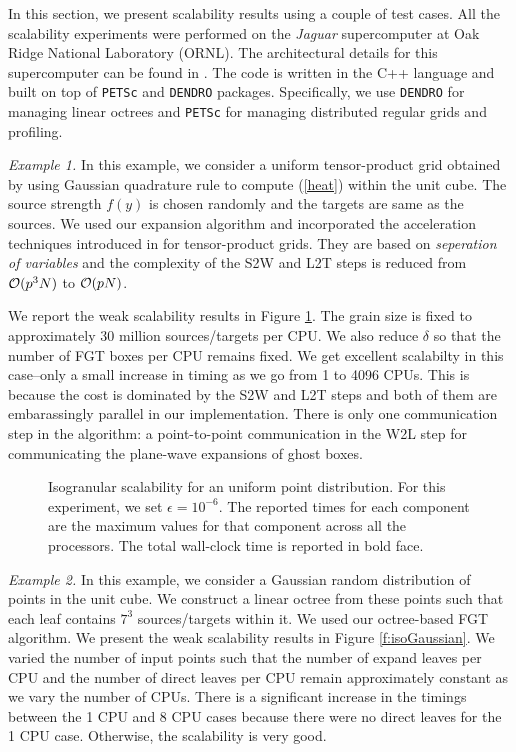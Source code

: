 
In this section, we present scalability results using a couple of test cases.  All the scalability experiments were performed 
on the {\it{Jaguar}} supercomputer at Oak Ridge National Laboratory (ORNL). The architectural details for this supercomputer
 can be found in \cite{jaguar}. The code is written in the C++ language and built on top of \texttt{PETSc} and \texttt{DENDRO} packages. 
 Specifically, we use \texttt{DENDRO} for managing linear octrees and \texttt{PETSc} for managing distributed regular grids and profiling. 

{\em Example 1.} In this example, we consider a uniform tensor-product grid obtained by using Gaussian quadrature rule to
 compute (\ref{heat}) within the unit cube. The source strength $f(y)$ is chosen randomly and the targets are same as the
  sources. We used our expansion algorithm and incorporated the acceleration techniques
  introduced in \cite{fggt} for tensor-product grids. They are based on {\em seperation of variables} and
  the complexity of the S2W and L2T steps is reduced from $\mathcal{O}(p^3 N)$ to $\mathcal{O}(p N)$. 

We report the weak scalability results in Figure \ref{f:isoUniform}. The grain size is fixed to approximately 30 million 
sources/targets per CPU. We also reduce $\delta$ so that the number of FGT boxes per CPU remains fixed. We get excellent
 scalabilty in this case--only a small increase in timing as we go from 1 to 4096 CPUs. This is  because the cost is dominated 
 by the S2W and L2T steps and both of them are embarassingly parallel in our implementation. There is only one communication 
 step in the algorithm: a point-to-point communication in the W2L step for communicating the plane-wave expansions of ghost boxes.

\begin{figure}
	\begin{center}
	
	\end{center}
\caption{\label{f:isoUniform} Isogranular scalability for an uniform point distribution. For
 this experiment, we set $\epsilon = 10^{-6}$. The reported times for 
each component are the maximum values for that component across all the processors. The total wall-clock
time is reported in bold face.} 
\end{figure}

{\em Example 2.} In this example, we consider a Gaussian random distribution of points in the unit cube. We construct
a linear octree from these points such that each leaf contains $7^3$ sources/targets within it. We used 
 our octree-based FGT algorithm. We present the weak scalability results in Figure \ref{f:isoGaussian}. We varied the
 number of input points such that the number of expand leaves per CPU and the number of direct leaves per CPU remain
  approximately constant as we vary the number of CPUs. There is a significant increase in the timings between the 
  1 CPU and 8 CPU cases because there were no direct leaves for the 1 CPU case. Otherwise, the scalability is very good.

